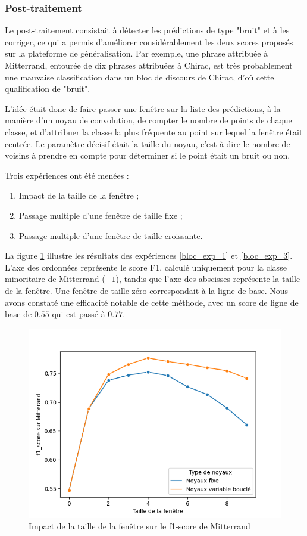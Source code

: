 \documentclass{article}
\begin{document}
\subsubsection{Post-traitement}

Le post-traitement consistait à détecter les prédictions de type "bruit" et à les corriger, ce qui a permis d'améliorer considérablement les deux scores proposés sur la plateforme de généralisation. Par exemple, une phrase attribuée à Mitterrand, entourée de dix phrases attribuées à Chirac, est très probablement une mauvaise classification dans un bloc de discours de Chirac, d'où cette qualification de "bruit". 

L'idée était donc de faire passer une fenêtre sur la liste des prédictions, à la manière d'un noyau de convolution, de compter le nombre de points de chaque classe, et d'attribuer la classe la plus fréquente au point sur lequel la fenêtre était centrée. Le paramètre décisif était la taille du noyau, c'est-à-dire le nombre de voisins à prendre en compte pour déterminer si le point était un bruit ou non.

Trois expériences ont été menées :
\begin{enumerate}
    \item Impact de la taille de la fenêtre ; \label{bloc_exp_1}
    \item Passage multiple d'une fenêtre de taille fixe ; \label{bloc_exp_2}
    \item Passage multiple d'une fenêtre de taille croissante. \label{bloc_exp_3}
\end{enumerate}

La figure \ref{fig_bloc_exp} illustre les résultats des expériences \ref{bloc_exp_1} et \ref{bloc_exp_3}. L'axe des ordonnées représente le score F1, calculé uniquement pour la classe minoritaire de Mitterrand ($-1$), tandis que l'axe des abscisses représente la taille de la fenêtre. Une fenêtre de taille zéro correspondait à la ligne de base. Nous avons constaté une efficacité notable de cette méthode, avec un score de ligne de base de $0.55$ qui est passé à $0.77$.

\begin{figure}[H]
    \centering
    \includegraphics[width=.75\textwidth]{src/locuteur/kernel_type_impact.png}
    \caption{Impact de la taille de la fenêtre sur le f1-score de Mitterrand}
    \label{fig_bloc_exp}
\end{figure}
\end{document}
